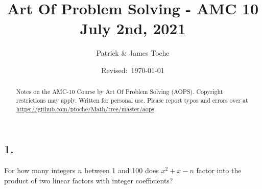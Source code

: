 \documentclass[12pt]{article}
\title{Art Of Problem Solving - AMC 10 \\ July 2nd, 2021}
\author{Patrick \& James Toche}
\date{Revised:~\today}
\begin{document}
\maketitle
\begin{minipage}{\textwidth}
\begin{abstract}\setlength{\parindent}{0pt}%
Notes on the AMC-10 Course by Art Of Problem Solving (AOPS).
Copyright restrictions may apply. Written for personal use. 
Please report typos and errors over at \url{https://github.com/ptoche/Math/tree/master/aops}. 
\end{abstract}
\end{minipage}

\thispagestyle{empty}
\clearpage


\subsection*{1.}

\nopagebreak

For how many integers $n$ between 1 and 100 does $x^2 + x - n$ factor into the product of two linear factors with integer coefficients?

\end{document}
